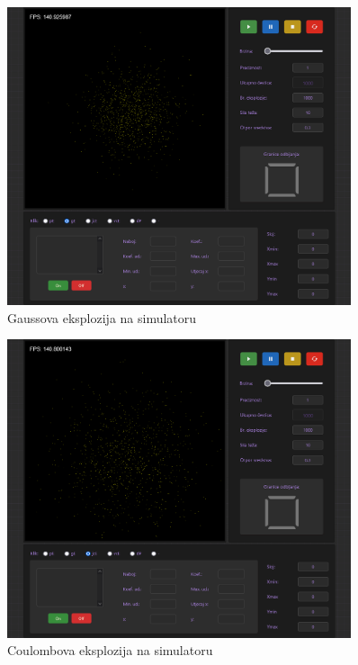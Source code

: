 \documentclass{foi}
\begin{document}
\begin{figure}[H]
    \centering
    \includegraphics[width=0.9\textwidth]{slike/23_GESimulator.png}
    \captionsetup{justification=centering}
    \caption{Gaussova eksplozija na simulatoru}
\label{fig:GESimulator}
\end{figure}

\begin{figure}[H]
    \centering
    \includegraphics[width=0.9\textwidth]{slike/24_CESimulator.png}
    \captionsetup{justification=centering}
    \caption{Coulombova eksplozija na simulatoru}
\label{fig:CESimulator}
\end{figure}
\end{document}
